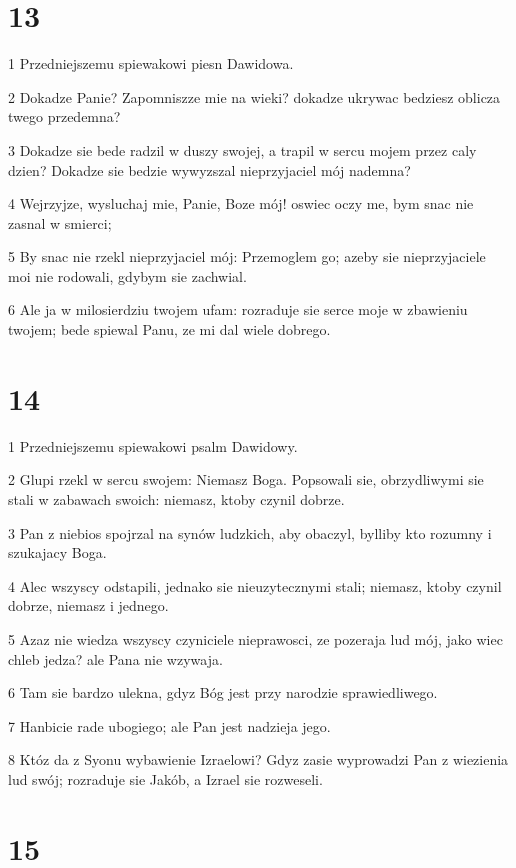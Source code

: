 \chapter{13}

\par 1 Przedniejszemu spiewakowi piesn Dawidowa.
\par 2 Dokadze Panie? Zapomniszze mie na wieki? dokadze ukrywac bedziesz oblicza twego przedemna?
\par 3 Dokadze sie bede radzil w duszy swojej, a trapil w sercu mojem przez caly dzien? Dokadze sie bedzie wywyzszal nieprzyjaciel mój nademna?
\par 4 Wejrzyjze, wysluchaj mie, Panie, Boze mój! oswiec oczy me, bym snac nie zasnal w smierci;
\par 5 By snac nie rzekl nieprzyjaciel mój: Przemoglem go; azeby sie nieprzyjaciele moi nie rodowali, gdybym sie zachwial.
\par 6 Ale ja w milosierdziu twojem ufam: rozraduje sie serce moje w zbawieniu twojem; bede spiewal Panu, ze mi dal wiele dobrego.

\chapter{14}

\par 1 Przedniejszemu spiewakowi psalm Dawidowy.
\par 2 Glupi rzekl w sercu swojem: Niemasz Boga. Popsowali sie, obrzydliwymi sie stali w zabawach swoich: niemasz, ktoby czynil dobrze.
\par 3 Pan z niebios spojrzal na synów ludzkich, aby obaczyl, bylliby kto rozumny i szukajacy Boga.
\par 4 Alec wszyscy odstapili, jednako sie nieuzytecznymi stali; niemasz, ktoby czynil dobrze, niemasz i jednego.
\par 5 Azaz nie wiedza wszyscy czyniciele nieprawosci, ze pozeraja lud mój, jako wiec chleb jedza? ale Pana nie wzywaja.
\par 6 Tam sie bardzo ulekna, gdyz Bóg jest przy narodzie sprawiedliwego.
\par 7 Hanbicie rade ubogiego; ale Pan jest nadzieja jego.
\par 8 Któz da z Syonu wybawienie Izraelowi? Gdyz zasie wyprowadzi Pan z wiezienia lud swój; rozraduje sie Jakób, a Izrael sie rozweseli.

\chapter{15}

